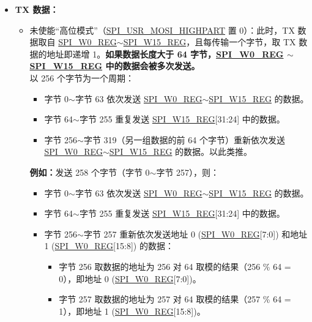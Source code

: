 \documentclass[main\_\_CN.tex]{subfiles}
\begin{document}
\begin{itemize}
    \item \textbf{TX 数据：}
    \begin{itemize}
        \item 未使能“高位模式”（\hyperref[fielddesc:SPIUSRMOSIHIGHPART]{SPI\_USR\_MOSI\_HIGHPART} 置 0）：此时，TX 数据取自 \hyperref[regdesc:SPIW0REG]{SPI\_W0\_REG}$\sim$\hyperref[regdesc:SPIW15REG]{SPI\_W15\_REG}，且每传输一个字节，取 TX 数据的地址即递增 1。\textbf{如果数据长度大于 64 字节，\hyperref[regdesc:SPIW0REG]{SPI\_W0\_REG} $\sim$ \hyperref[regdesc:SPIW15REG]{SPI\_W15\_REG} 中的数据会被多次发送。}\\
        以 256 个字节为一个周期：
        \begin{itemize}
            \item 字节 0$\sim$字节 63 依次发送 \hyperref[regdesc:SPIW0REG]{SPI\_W0\_REG}$\sim$\hyperref[regdesc:SPIW15REG]{SPI\_W15\_REG} 的数据。
            \item 字节 64$\sim$字节 255 重复发送 \hyperref[regdesc:SPIW15REG]{SPI\_W15\_REG}[31:24] 中的数据。
            \item 字节 256$\sim$字节 319（另一组数据的前 64 个字节）重新依次发送 \hyperref[regdesc:SPIW0REG]{SPI\_W0\_REG}$\sim$\hyperref[regdesc:SPIW15REG]{SPI\_W15\_REG} 的数据。以此类推。
        \end{itemize}
        \textbf{例如：}发送 258 个字节（字节 0$\sim$字节 257），则：
        \begin{itemize}
            \item 字节 0$\sim$字节 63 依次发送 \hyperref[regdesc:SPIW0REG]{SPI\_W0\_REG}$\sim$\hyperref[regdesc:SPIW15REG]{SPI\_W15\_REG} 的数据。
            \item 字节 64$\sim$字节 255 重复发送 \hyperref[regdesc:SPIW15REG]{SPI\_W15\_REG}[31:24] 中的数据。
            \item 字节 256$\sim$字节 257 重新依次发送地址 0 (\hyperref[regdesc:SPIW0REG]{SPI\_W0\_REG}[7:0]) 和地址 1 (\hyperref[regdesc:SPIW0REG]{SPI\_W0\_REG}[15:8]) 的数据：
                \begin{itemize}
                    \item 字节 256 取数据的地址为 256 对 64 取模的结果（256 \% 64 = 0），即地址 0 (\hyperref[regdesc:SPIW0REG]{SPI\_W0\_REG}[7:0])。
                    \item 字节 257 取数据的地址为 257 对 64 取模的结果（257 \% 64 = 1），即地址 1 (\hyperref[regdesc:SPIW0REG]{SPI\_W0\_REG}[15:8])。
                \end{itemize}

\end{itemize}
\end{itemize}
\end{itemize}
\end{document}
